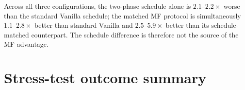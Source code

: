 \documentclass[11pt]{article}
\newcommand{\Ncol}{N_{\mathrm{col}}}
\begin{document}
\begin{table}[t]
\centering
\caption{LR schedule control (5 seeds, $\Ncol = 100$). Three conditions: (1)~Vanilla standard (25k epochs at $\eta = 5 \times 10^{-4}$), (2)~Vanilla schedule (5k at $5 \times 10^{-4}$ then 20k at $10^{-4}$), (3)~MF two-phase (5k data + 20k physics). The matched-schedule Vanilla is consistently \emph{worse} than the standard schedule, so the MF advantage cannot be attributed to the schedule alone.}
\label{tab:lr_control}
\end{table}

Across all three configurations, the two-phase schedule alone is $2.1$--$2.2\times$ worse than the standard Vanilla schedule; the matched MF protocol is simultaneously $1.1$--$2.8\times$ better than standard Vanilla and $2.5$--$5.9\times$ better than its schedule-matched counterpart. The schedule difference is therefore not the source of the MF advantage.

\section{Stress-test outcome summary}
\label{sec:stress_summary_supp}
\end{document}
